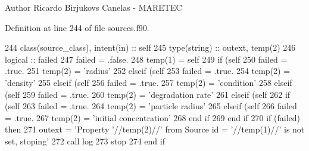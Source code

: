 \begin{DoxyAuthor}{Author}
Ricardo Birjukovs Canelas -\/ M\+A\+R\+E\+T\+EC 
\end{DoxyAuthor}


Definition at line 244 of file sources.\+f90.


\begin{DoxyCode}
244     \textcolor{keywordtype}{class}(source\_class), \textcolor{keywordtype}{intent(in)} :: self
245     \textcolor{keywordtype}{type}(string) :: outext, temp(2)
246     \textcolor{keywordtype}{logical} :: failed
247     failed = .false.
248     temp(1) = self%
249     \textcolor{keywordflow}{if} (self%
250         failed = .true.
251         temp(2) = \textcolor{stringliteral}{'radius'}
252     \textcolor{keywordflow}{elseif} (self%
253         failed = .true.
254         temp(2) = \textcolor{stringliteral}{'density'}
255     \textcolor{keywordflow}{elseif} (self%
256         failed = .true.
257         temp(2) = \textcolor{stringliteral}{'condition'}
258     \textcolor{keywordflow}{elseif} (self%
259         failed = .true.
260         temp(2) = \textcolor{stringliteral}{'degradation rate'}
261     \textcolor{keywordflow}{elseif} (self%
262         \textcolor{keywordflow}{if} (self%
263             failed = .true.
264             temp(2) = \textcolor{stringliteral}{'particle radius'}
265         \textcolor{keywordflow}{elseif} (self%
266             failed = .true.
267             temp(2) = \textcolor{stringliteral}{'initial concentration'}
268 \textcolor{keywordflow}{        end if}
269 \textcolor{keywordflow}{    end if}
270     \textcolor{keywordflow}{if} (failed) \textcolor{keywordflow}{then}
271         outext = \textcolor{stringliteral}{'Property '}//temp(2)//\textcolor{stringliteral}{' from Source id = '}//temp(1)//\textcolor{stringliteral}{' is not set, stoping'}
272         \textcolor{keyword}{call }log%
273         stop
274 \textcolor{keywordflow}{    end if}
\end{DoxyCode}
\mbox{\label{namespacesources__mod_a0d56083fdc0453f03f9dfdb24f704ac4}} 
